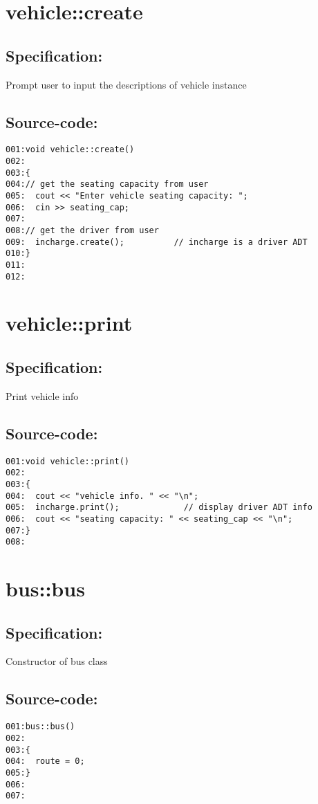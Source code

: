 \section{vehicle::create}
\subsection*{Specification:}
Prompt user to input the descriptions of vehicle instance
\subsection*{Source-code:}
\begin{verbatim}
001:void vehicle::create()
002:
003:{
004:// get the seating capacity from user
005:  cout << "Enter vehicle seating capacity: ";
006:  cin >> seating_cap;
007:
008:// get the driver from user
009:  incharge.create();          // incharge is a driver ADT
010:}
011:
012:
\end{verbatim}
\section{vehicle::print}
\subsection*{Specification:}
Print vehicle info
\subsection*{Source-code:}
\begin{verbatim}
001:void vehicle::print()
002:     
003:{
004:  cout << "vehicle info. " << "\n";
005:  incharge.print();             // display driver ADT info
006:  cout << "seating capacity: " << seating_cap << "\n";
007:}
008:
\end{verbatim}
\section{bus::bus}
\subsection*{Specification:}
Constructor of bus class
\subsection*{Source-code:}
\begin{verbatim}
001:bus::bus()
002:
003:{
004:  route = 0;
005:}
006:
007:
\end{verbatim}
